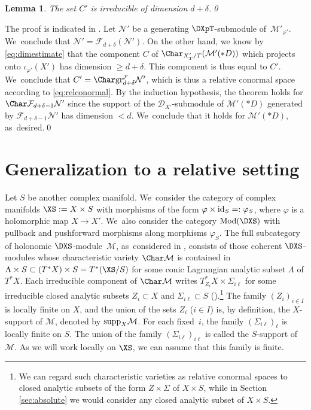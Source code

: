 \documentclass{amsart}
\theoremstyle{plain}
\numberwithin{theorem}{section}
\newtheorem{lemma}[theorem]{Lemma}
\theoremstyle{definition}
\theoremstyle{remark}
\theoremstyle{definition}
\newcommand{\cD}{\mathcal{D}}
\newcommand{\cF}{\mathcal{F}}
\newcommand{\cM}{\mathcal{M}}
\newcommand{\cN}{\mathcal{N}}
\newcommand{\gr}{\textup{gr}}
\newcommand{\Mod}{\textup{Mod}}
\newcommand{\id}{\textup{id}}
\newcommand{\supp}{\textup{supp}}
\begin{document}
\begin{lemma}\label{lem:irreducible}
The set $C'$ is irreducible of dimension $d+\delta$.\qed
\end{lemma}

The proof is indicated in \cite[p.\,233]{Sab2}. Let $\cN'$ be a generating $\DXpT$-submodule of~$\cM'_{\varphi'}$. We~conclude that $\cN'=\cF_{d+\delta}(\cN')$. On the other hand, we know by \eqref{eq:dimestimate} that the component $C$ of $\Char_{X'_T/T}(\cM'(*D))$ which projects onto $\iota_{\varphi'}(X')$ has dimension $\geq d+\delta$. This component is thus equal to $C'$. We~conclude that $C'=\Char\gr_{d+\delta}^\cF\cN'$, which is thus a relative conormal space according to \eqref{eq:relconormal}. By the induction hypothesis, the theorem holds for $\Char\cF_{d+\delta-1}\cN'$ since the support of the $\cD_{X'}$-submodule of $\cM'(*D)$ generated by $\cF_{d+\delta-1}\cN'$ has dimension $<d$. We~conclude that it holds for $\cM'(*D)$, as~desired.\qed

\section{Generalization to a relative setting}\label{sec:relative}

Let $S$ be another complex manifold. We~consider the category of complex manifolds $\XS:=X\times S$ with morphisms of the form $\varphi\times\id_S=:\varphi_S$, where $\varphi$ is a holomorphic map $X\to X'$. We~also consider the category $\Mod(\DXS)$ with pullback and pushforward morphisms along morphisms $\varphi_S$. The full subcategory of holonomic $\DXS$-module~$\cM$, as~considered in \cite{FFS23}, consists of those coherent $\DXS$-modules whose characteristic variety $\Char\cM$ is contained in $\Lambda\times S\subset (T^*X)\times S=T^*(\XS/S)$ for some conic Lagrangian analytic subset $\Lambda$ of $T^*X$. Each irreducible component of $\Char\cM$ writes $T^*_{Z_i}X\times \Sigma_{i\ell}$ for some irreducible closed analytic subsets $Z_i\subset X$ and $\Sigma_{i\ell}\subset S$ (\cf\cite[Lem.\,2.10]{FTM18}).\footnote{We can regard such characteristic varieties as relative conormal spaces to closed analytic subsets of the form $Z\times \Sigma$ of $X\times S$, while in Section \ref{sec:absolute} we would consider any closed analytic subset of $X\times S$.} The family $(Z_i)_{i\in I}$ is locally finite on $X$, and the union of the sets $Z_i$ ($i\in I$) is, by definition, the $X$-support of $\cM$, denoted by $\supp_X\cM$. For each fixed~$i$, the family $(\Sigma_{i\ell})_\ell$ is locally finite on $S$. The union of the family $(\Sigma_{i\ell})_{i\ell}$ is called the $S$-support of $\cM$. As we will work locally on $\XS$, we can assume that this family is finite.
\end{document}
